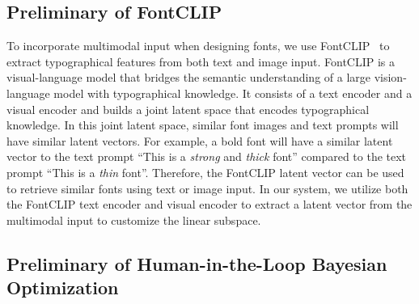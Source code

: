 \subsection{Preliminary of FontCLIP}
To incorporate multimodal input when designing fonts, we use FontCLIP~\cite{tatsukawa2024fontclip} to extract typographical features from both text and image input.
FontCLIP is a visual-language model that
bridges the semantic understanding of a large vision-language model with typographical knowledge.
It consists of a text encoder and a visual encoder and builds a joint latent space that encodes typographical knowledge.
In this joint latent space, similar font images and text prompts will have similar latent vectors.
For example, a bold font will have a similar latent vector to the text prompt ``This is a \textit{strong} and \textit{thick} font'' compared to the text prompt ``This is a \textit{thin} font''.
Therefore, the FontCLIP latent vector can be used to retrieve similar fonts using text or image input.
In our system, we utilize both the FontCLIP text encoder and visual encoder to extract a latent vector from the multimodal input to customize the linear subspace.

\subsection{Preliminary of Human-in-the-Loop Bayesian Optimization}
\label{method:prelim_BO}
